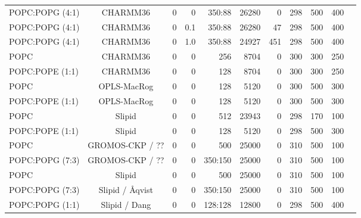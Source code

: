 \documentclass[journal=jpcbfk]{achemso}
\begin{document}
\begin{table}[htb]
\begin{minipage}[t]{\textwidth}
{\begin{tabular}{l c c r r r r r r c c}
      POPC:POPG (4:1)        & CHARMM36 \cite{??}        &0          & 0  & 350:88 & 26280 & 0  &  298  & 500 & 400 & \cite{CHARMM36POPCPOPG4010} \\
      POPC:POPG (4:1)        & CHARMM36 \cite{??}        &0          & 0.1 & 350:88 & 26280 & 47  &  298  & 500 & 400 & \cite{CHARMM36POPCPOPG4010100mMCaCl} \\
      POPC:POPG (4:1)        & CHARMM36 \cite{??}        &0          & 1.0 & 350:88 & 24927 & 451  &  298  & 500 & 400 & \cite{CHARMM36POPCPOPG40101000mMCaCl} \\
      \hline
      POPC             & CHARMM36 \cite{??}        &0          & 0  & 256 & 8704 & 0  &  300  & 300 & 250 & \cite{POPCcharmm300K} \\
      POPC:POPE (1:1)  & CHARMM36 \cite{??}        &0          & 0  & 128 & 8704 & 0  &  300  & 300 & 250 & \cite{POPC1POPE1charmm36} \\
      \hline
      POPC             & OPLS-MacRog \cite{rog16}     &0          & 0  & 128 & 5120 & 0  &  300  & 500 & 300 & \cite{POPCmacrog300K} \\
      POPC:POPE (1:1)  & OPLS-MacRog \cite{rog16}     &0          & 0  & 128 & 5120 & 0  &  300  & 500 & 300 & \cite{POPC1POPE1macrogT300K} \\
      \hline
      POPC             & Slipid \cite{jambeck12b}     &0          & 0  & 512 & 23943 & 0  &  298  & 170 & 100 & \cite{POPCslipid298K} \\
      POPC:POPE (1:1)  & Slipid \cite{jambeck12b}     &0          & 0  & 128 & 5120  & 0  &  298  & 500 & 300 & \cite{POPC1POPE1slipidT298K} \\
     \hline
      POPC                   & GROMOS-CKP / ?? \cite{??,??}  & 0         & 0  & 500     & 25000 & 0   &  310  & 500 & 100 & \cite{POPCgromosCKPT310K}  \\
      POPC:POPG (7:3)        & GROMOS-CKP / ?? \cite{??,??}  & 0         & 0  & 350:150 & 25000 & 0   &  310  & 500 & 100 & \cite{POPC7POPG3gromosCKPT310K} \\
     \hline
      POPC                   & Slipid \cite{jambeck12b}  & 0         & 0  & 500     & 25000 & 0   &  310  & 500 & 100 & \cite{POPCslipid301K}  \\
      POPC:POPG (7:3)        & Slipid / {\AA}qvist \cite{jambeck12b,aqvist90}  & 0         & 0  & 350:150 & 25000 & 0   &  310  & 500 & 100 & \cite{slipidPOPC70POPG30T310K} \\
      POPC:POPG (1:1)        & Slipid / Dang \cite{jambeck12b,jambeck2012another,smith94,dang06} & 0         & 0  & 128:128 & 12800 & 0   &  298  & 500 & 400 & \cite{slipidPOPC50POPG50T298K} \\

\end{tabular}}
\end{minipage}
\end{table}
\end{document}
